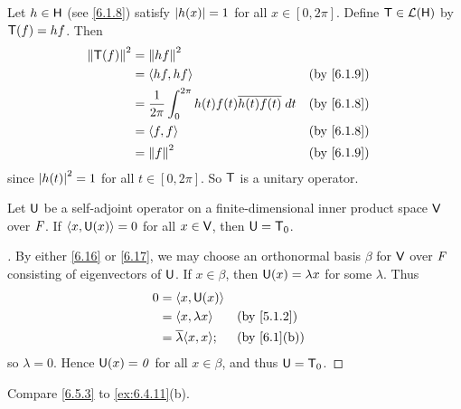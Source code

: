 \begin{eg}\label{6.5.2}
	Let \(h \in \mathsf{H}\) (see \cref{6.1.8}) satisfy \(\left\lvert h(x)\right\rvert = 1\) for all \(x \in [0, 2 \pi]\).
	Define \(\mathsf{T} \in \mathcal{L}(\mathsf{H})\) by \(\mathsf{T}(f) = hf\).
	Then
	\begin{align*}
		\norm{\T(f)}^2 & = \norm{hf}^2                                                                     \\
		               & = \inn{hf, hf}                                                    &  & \by{6.1.9} \\
		               & = \frac{1}{2 \pi} \int_0^{2 \pi} h(t) f(t) \conj{h(t) f(t)} \; dt &  & \by{6.1.8} \\
		               & = \inn{f, f}                                                      &  & \by{6.1.8} \\
		               & = \norm{f}^2                                                      &  & \by{6.1.9}
	\end{align*}
	since \(\left\lvert h(t)\right\rvert^2 = 1\) for all \(t \in [0, 2 \pi]\).
	So \(\mathsf{T}\) is a unitary operator.
\end{eg}

\begin{lem}\label{6.5.3}
	Let \(\mathsf{U}\) be a self-adjoint operator on a finite-dimensional inner product space \(\mathsf{V}\) over \(\mathit{F}\).
	If \(\left\langle x, \mathsf{U}(x)\right\rangle = 0\) for all \(x \in \mathsf{V}\), then \(\mathsf{U} = \mathsf{T}_0\).
\end{lem}

\begin{proof}[]
	By either \cref{6.16} or \cref{6.17}, we may choose an orthonormal basis \(\beta\) for \(\mathsf{V}\) over \(\mathit{F}\) consisting of eigenvectors of \(\mathsf{U}\).
	If \(x \in \beta\), then \(\mathsf{U}(x) = \lambda x\) for some \(\lambda\).
	Thus
	\begin{align*}
		0 & = \inn{x, \U(x)}                              \\
		  & = \inn{x, \lambda x}         &  & \by{5.1.2}  \\
		  & = \conj{\lambda} \inn{x, x}; &  & \by{6.1}[b]
	\end{align*}
	so \(\lambda = 0\).
	Hence \(\mathsf{U}(x) = \mathit{0}\) for all \(x \in \beta\), and thus \(\mathsf{U} = \mathsf{T}_0\).
\end{proof}

\begin{note}
	Compare \cref{6.5.3} to \cref{ex:6.4.11}(b).
\end{note}

